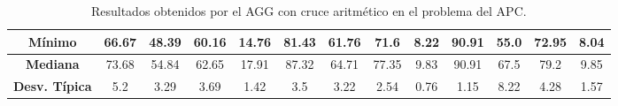 \documentclass[11pt,a4paper]{article}
\begin{document}
\begin{table}[H]
{\begin{tabular}{c|c|c|c|c|c|c|c|c|c|c|c|c|}
\multicolumn{1}{|c|}{\textbf{Mínimo}}       & 66.67             & 48.39                   & 60.16         & 14.76      & 81.43             & 61.76          & 71.6          & 8.22       & 90.91             & 55.0           & 72.95         & 8.04       \\ \hline
\multicolumn{1}{|c|}{\textbf{Mediana}}      & 73.68             & 54.84                   & 62.65         & 17.91      & 87.32             & 64.71          & 77.35         & 9.83       & 90.91             & 67.5           & 79.2          & 9.85       \\ \hline
\multicolumn{1}{|c|}{\textbf{Desv. Típica}} & 5.2               & 3.29                    & 3.69          & 1.42       & 3.5               & 3.22           & 2.54          & 0.76       & 1.15              & 8.22           & 4.28          & 1.57       \\ \hline
\end{tabular}
}%
\caption{Resultados obtenidos por el AGG con cruce aritmético en el problema del APC.}
\end{table}
\end{document}
